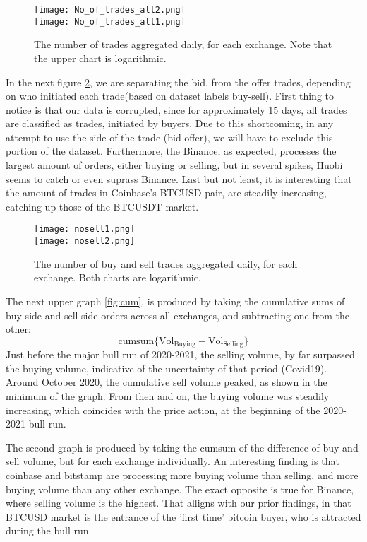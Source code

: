 \begin{figure}[H]
	\centering
    \texttt{[image: No\_of\_trades\_all2.png]} \\
    \texttt{[image: No\_of\_trades\_all1.png]} \\ 
	\caption{The number of trades aggregated daily, for each exchange. Note that the upper chart is logarithmic.}
    \label{fig:nooftrades}
\end{figure}

In the next figure \ref{fig:nooftrades2}, we are separating the bid, from the offer trades, depending on who initiated each trade(based on  dataset labels buy-sell). First thing to notice is that our data is corrupted, since for approximately 15 days, all trades are classified as trades, initiated by buyers. Due to this shortcoming, in any attempt to use the side of the trade (bid-offer), we will have to exclude this portion of the dataset. Furthermore, the Binance, as expected, processes the largest amount of orders, either buying or selling, but in several spikes, Huobi seems to catch or even suprass Binance. Last but not least, it is interesting that the amount of trades in Coinbase's BTCUSD pair, are steadily increasing, catching up those of the BTCUSDT market.

\begin{figure}[H]
	\centering
    \texttt{[image: nosell1.png]} \\
    \texttt{[image: nosell2.png]} \\ 
	\caption{The number of buy and sell trades aggregated daily, for each exchange. Both charts are logarithmic.}
    \label{fig:nooftrades2}
\end{figure}


The next upper graph \ref{fig:cum}, is produced by taking the cumulative sums of buy side and sell side orders across all exchanges, and subtracting one from the other: 
\[ \text{cumsum}\{\text{Vol}_{\text{Buying}} - \text{Vol}_{\text{Selling}}\} \]
Just before the major bull run of 2020-2021, the selling volume, by far surpassed the buying volume, indicative of the uncertainty of that period (Covid19). Around October 2020, the cumulative sell volume peaked, as shown in the minimum of the graph. From then and on, the buying volume was steadily increasing, which coincides with the price action, at the beginning of the 2020-2021 bull run.  

The second graph is produced by taking the cumsum of the difference of buy and sell volume, but for each exchange individually. An interesting finding is that coinbase and bitstamp are processing more buying volume than selling, and more buying volume than any other exchange. The exact opposite is true for Binance, where selling volume is the highest. That alligns with our prior findings, in that BTCUSD market is the entrance of the 'first time' bitcoin buyer, who is attracted during the bull run. 



